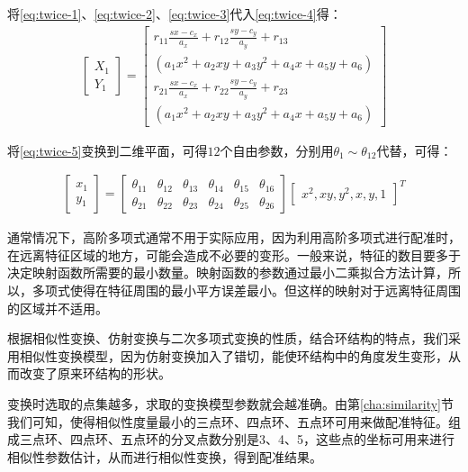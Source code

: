 \begin{enumerate}
将\ref{eq:twice-1}、\ref{eq:twice-2}、\ref{eq:twice-3}代入\ref{eq:twice-4}得：
\begin{align}
\left[ \begin{array}{c}
X_1 \\
Y_1
\end{array} \right]
=
\left[ \begin{array}{c}
r_{11}\frac{sx-c_x}{a_x} + r_{12}\frac{sy-c_y}{a_y} + r_{13} \\
(a_1x^2 + a_2xy + a_3y^2 + a_4x + a_5y + a_6)\\
r_{21}\frac{sx-c_x}{a_x} + r_{22}\frac{sy-c_y}{a_y} + r_{23}\\
(a_1x^2 + a_2xy + a_3y^2 + a_4x + a_5y + a_6)
\end{array} \right]
\label{eq:twice-5}
\end{align}

将\ref{eq:twice-5}变换到二维平面，可得$12$个自由参数，分别用$\theta_1 \sim \theta_{12}$代替，可得：

\begin{align}
\left[ \begin{array}{c}
x_1 \\
y_1
\end{array} \right]
=
\left[ \begin{array}{cccccc}
\theta_{11} & \theta_{12} & \theta_{13} & \theta_{14} & \theta_{15} & \theta_{16} \\
\theta_{21} & \theta_{22} & \theta_{23} & \theta_{24} & \theta_{25} & \theta_{26} 
\end{array} \right]
\left[ \begin{array}{c}
x^2, xy, y^2, x, y, 1
\end{array} \right]^T
\end{align}

通常情况下，高阶多项式通常不用于实际应用，因为利用高阶多项式进行配准时，在远离特征区域的地方，可能会造成不必要的变形。一般来说，特征的数目要多于决定映射函数所需要的最小数量。映射函数的参数通过最小二乘拟合方法计算，所以，多项式使得在特征周围的最小平方误差最小。但这样的映射对于远离特征周围的区域并不适用。
\end{enumerate}

根据相似性变换、仿射变换与二次多项式变换的性质，结合环结构的特点，我们采用相似性变换模型，因为仿射变换加入了错切，能使环结构中的角度发生变形，从而改变了原来环结构的形状。

变换时选取的点集越多，求取的变换模型参数就会越准确。由第\ref{cha:similarity}节我们可知，使得相似性度量最小的三点环、四点环、五点环可用来做配准特征。组成三点环、四点环、五点环的分叉点数分别是3、4、5，这些点的坐标可用来进行相似性参数估计，从而进行相似性变换，得到配准结果。

